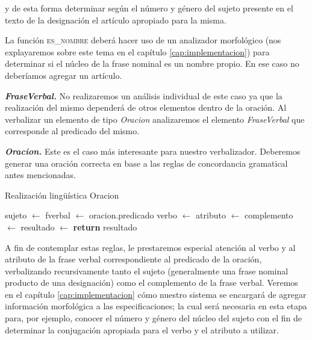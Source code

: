 \noindent
y de esta forma determinar según el número y género del sujeto presente en el texto de la designación el artículo apropiado para la misma.

La función \textsc{es\_nombre} deberá hacer uso de un analizador morfológico (nos explayaremos sobre este tema en el capítulo \ref{cap:implementacion}) para determinar si el núcleo de la frase nominal es un nombre propio. En ese caso no deberíamos agregar un artículo.

\medskip
\noindent
\textbf{\emph{FraseVerbal.}} No realizaremos un análisis individual de este caso ya que la realización del mismo dependerá de otros elementos dentro de la oración. Al verbalizar un elemento de tipo \emph{Oracion} analizaremos el elemento \emph{FraseVerbal} que corresponde al predicado del mismo.


\medskip
\noindent
\textbf{\emph{Oracion.}} Este es el caso más interesante para nuestro verbalizador. Deberemos generar una oración correcta en base a las reglas de concordancia gramatical antes mencionadas. 

\begin{algorithm}[H]
\caption{Realización lingüística Oracion}
\begin{algorithmic}[1]
\State sujeto $\gets$ 
\State fverbal $\gets$ oracion.predicado
\State verbo $\gets$ 
\State atributo $\gets$ 
\State complemento $\gets$ 
\State resultado $\gets$ 
\State \textbf{return} resultado
\EndFunction
\end{algorithmic}
\end{algorithm}

\noindent
A fin de contemplar estas reglas, le prestaremos especial atención al verbo y al atributo de la frase verbal correspondiente al predicado de la oración, verbalizando recursivamente tanto el sujeto (generalmente una frase nominal producto de una designación) como el complemento de la frase verbal. Veremos en el capítulo \ref{cap:implementacion} cómo nuestro sistema se encargará de agregar información morfológica a las especificaciones; la cual será necesaria en esta etapa para, por ejemplo, conocer el número y género del núcleo del sujeto con el fin de  determinar la conjugación apropiada para el verbo y el atributo a utilizar.


